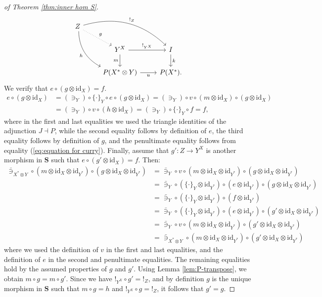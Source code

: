 \documentclass[12pt]{tac}
\theoremstyle{definition}
\theoremstyle{remark}
\newcommand{\<}{\langle}
\renewcommand{\>}{\rangle}
\renewcommand{\:}{\colon}
\newcommand{\id}{\mathrm{id}}
\begin{document}
\begin{proof}[of Theorem \ref{thm:inner hom S}]
 \[\begin{tikzcd}
Z\arrow[bend right=30,swap]{ddr}{h}\arrow[bend left=30]{rrd}{!_Z}\arrow[dotted]{dr}{g} && \\
&Y^X\ar{d}[swap]{m}\ar{r}{!_{Y^X}} & I\ar{d}{k}\\
&P(X^*\otimes Y)\ar{r}[swap]{u} &P(X^*).
\end{tikzcd}\]
We verify that $e\circ (g\otimes\id_X)=f$.
\begin{align*}
    e\circ (g\otimes\id_X) & = (\ni_Y)\circ\{\cdot\}_Y\circ e\circ (g\otimes\id_X) = (\ni_Y)\circ v \circ (m\otimes \id_X)\circ(g\otimes\id_X)\\
    & = (\ni_Y)\circ v\circ(h\otimes\id_X)= (\ni_Y)\circ \{\cdot\}_Y\circ f = f,
\end{align*}
where in the first and last equalities we used the triangle identities of the adjunction $J\dashv P$, while the second equality follows by definition of $e$, the third equality follows by definition of $g$, and the penultimate equality follows from equality (\ref{eq:equation for curry}).
Finally, assume that $g':Z\to Y^X$ is another morphism in $\mathbf S$ such that $e\circ(g' \otimes\id_X)=f$. Then:
\begin{align*}
    \bar\ni_{X^*\otimes Y}\circ (m\otimes\id_X\otimes\id_{Y^*})\circ(g\otimes\id_X\otimes\id_{Y^*}) & = \bar\ni_Y\circ v\circ (m\otimes\id_X\otimes\id_{Y^*})\circ (g\otimes\id_X\otimes\id_{Y^*})\\
    & = \bar\ni_Y\circ (\{\cdot\}_Y\otimes \id_{Y^*})\circ (e\otimes\id_{Y^*})\circ (g\otimes\id_X\otimes\id_{Y^*})\\
    & = \bar\ni_Y\circ (\{\cdot\}_Y\otimes\id_{Y^*})\circ (f\otimes\id_{Y^*})\\
    & = \bar\ni_Y\circ (\{\cdot\}_Y\otimes \id_{Y^*})\circ (e\otimes\id_{Y^*})\circ (g' \otimes\id_X\otimes\id_{Y^*})\\
    & = \bar\ni_Y\circ v\circ (m\otimes\id_X\otimes\id_{Y^*})\circ (g' 
 \otimes\id_X\otimes\id_{Y^*})\\
    & =     \bar\ni_{X^*\otimes Y}\circ (m\otimes\id_X\otimes\id_{Y^*})\circ(g'\otimes\id_X\otimes\id_{Y^*})
\end{align*}
where we used the definition of $v$ in the first and last equalities, and the definition of $e$ in the second and penultimate equalities. The remaining equalities hold by the assumed properties of $g$ and $g'$. Using Lemma \ref{lem:P-transpose}, we obtain $m\circ g=m\circ g'$. Since we have  $!_{Y^ X}\circ g' =!_Z$, and by definition $g$ is the unique morphism in $\mathbf S$ such that $m\circ g=h$ and $!_{Y^X}\circ g=!_Z$, it follows that $g' =g$. 
\end{proof}
\end{document}
